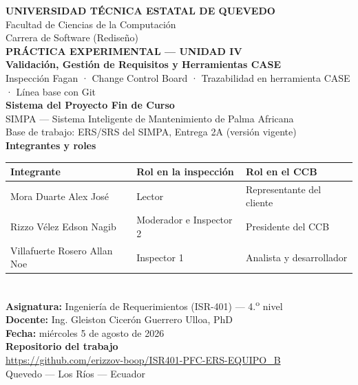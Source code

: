 \documentclass[11pt,letterpaper]{article}
\begin{document}
\begin{titlepage}
\centering
\vspace*{1cm}

{\large\textbf{UNIVERSIDAD TÉCNICA ESTATAL DE QUEVEDO}}\\[0.3cm]
{\normalsize Facultad de Ciencias de la Computación}\\[0.2cm]
{\normalsize Carrera de Software (Rediseño)}\\[1.5cm]

{\large\textbf{PRÁCTICA EXPERIMENTAL --- UNIDAD IV}}\\[0.5cm]
{\Large\textbf{Validación, Gestión de Requisitos y Herramientas CASE}}\\[0.4cm]
{\normalsize Inspección Fagan · Change Control Board · Trazabilidad en herramienta CASE · Línea base con Git}\\[1.5cm]

{\normalsize\textbf{Sistema del Proyecto Fin de Curso}}\\[0.2cm]
{\large SIMPA --- Sistema Inteligente de Mantenimiento de Palma Africana}\\[0.2cm]
{\footnotesize Base de trabajo: ERS/SRS del SIMPA, Entrega 2A (versión vigente)}\\[1.2cm]

{\normalsize\textbf{Integrantes y roles}}\\[0.4cm]
\begin{tabular}{L{5.5cm} L{4cm} L{4cm}}
\toprule
\textbf{Integrante} & \textbf{Rol en la inspección} & \textbf{Rol en el CCB}\\
\midrule
Mora Duarte Alex José & Lector & Representante del cliente\\
Rizzo Vélez Edson Nagib & Moderador e Inspector 2 & Presidente del CCB\\
Villafuerte Rosero Allan Noe & Inspector 1 & Analista y desarrollador\\
\bottomrule
\end{tabular}\\[1.2cm]

{\normalsize\textbf{Asignatura:} Ingeniería de Requerimientos (ISR-401) --- 4.\textsuperscript{o} nivel}\\[0.2cm]
{\normalsize\textbf{Docente:} Ing. Gleiston Cicerón Guerrero Ulloa, PhD}\\[0.2cm]
{\normalsize\textbf{Fecha:} miércoles 5 de agosto de 2026}\\[0.2cm]

{\normalsize\textbf{Repositorio del trabajo}}\\[0.2cm]
{\small\url{https://github.com/erizzov-boop/ISR401-PFC-ERS-EQUIPO_B}}\\[1.5cm]

{\footnotesize Quevedo --- Los Ríos --- Ecuador}

\end{titlepage}
\end{document}
